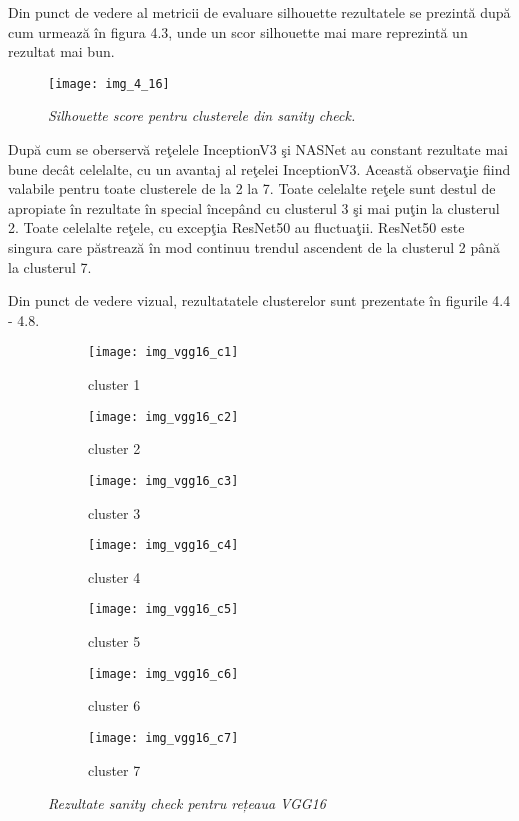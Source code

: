 Din punct de vedere al metricii de evaluare silhouette rezultatele se prezintă după cum urmează în figura 4.3, unde un scor silhouette mai mare reprezintă un rezultat mai bun.
\begin{figure}[!h]
	\centering
	\texttt{[image: img\_4\_16]}
	\caption[Silhouette score pentru clusterele din sanity check]{\textit{Silhouette score pentru clusterele din sanity check.}}
\end{figure} 
După cum se oberservă reţelele InceptionV3 şi NASNet au constant rezultate mai bune decât celelalte, cu un avantaj al reţelei InceptionV3. Această observaţie
fiind valabile pentru toate clusterele de la 2 la 7. Toate celelalte reţele sunt destul de
apropiate în rezultate în special începând cu clusterul 3 şi mai puţin la clusterul 2. Toate
celelalte reţele, cu excepţia ResNet50 au fluctuaţii. ResNet50 este singura care păstrează
în mod continuu trendul ascendent de la clusterul 2 până la clusterul 7.

Din punct de vedere vizual, rezultatatele clusterelor sunt prezentate în figurile 4.4 - 4.8.
\begin{figure}[!h]
  \centering
  \begin{subfigure}[t]{0.45\textwidth}
    \caption{cluster 1}
    \texttt{[image: img\_vgg16\_c1]}
  \end{subfigure}
  \hfill
  \begin{subfigure}[t]{0.45\textwidth}
    \caption{cluster 2}
    \texttt{[image: img\_vgg16\_c2]}
  \end{subfigure}
   \hfill
  \begin{subfigure}[t]{0.45\textwidth}
    \caption{cluster 3}
    \texttt{[image: img\_vgg16\_c3]}
  \end{subfigure}
  \hfill
  \begin{subfigure}[t]{0.45\textwidth}
    \caption{cluster 4}
    \texttt{[image: img\_vgg16\_c4]}
  \end{subfigure}
  \hfill
  \begin{subfigure}[t]{0.45\textwidth}
    \caption{cluster 5}
    \texttt{[image: img\_vgg16\_c5]}
  \end{subfigure}
  \hfill
  \begin{subfigure}[t]{0.45\textwidth}
    \caption{cluster 6}
    \texttt{[image: img\_vgg16\_c6]}
  \end{subfigure}
    \hfill
  \begin{subfigure}[t]{0.45\textwidth}
    \caption{cluster 7}
    \texttt{[image: img\_vgg16\_c7]}
  \end{subfigure}
  \caption[Rezultate sanity check pentru rețeaua VGG16]{\textit{Rezultate sanity check pentru rețeaua VGG16}}
\end{figure}

